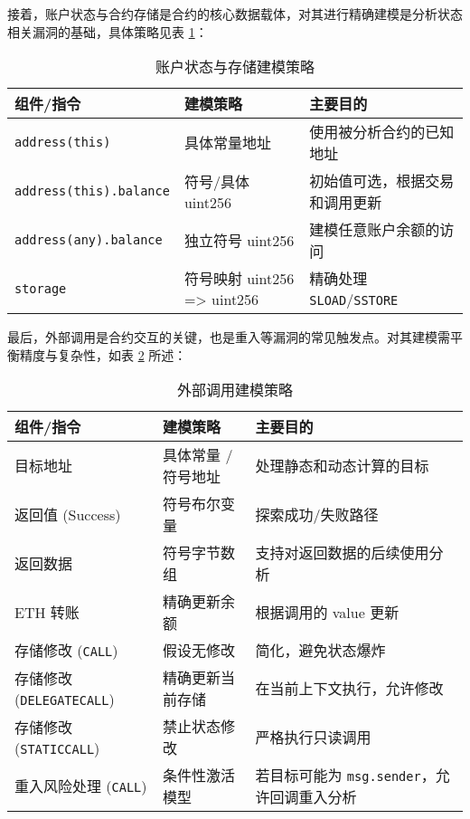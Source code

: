 \documentclass[print, master, vlined, timesmath]{DissertUESTC}
\begin{document}
接着，账户状态与合约存储是合约的核心数据载体，对其进行精确建模是分析状态相关漏洞的基础，具体策略见表 \ref{tab:account_state_modeling}：

\begin{table}[H] %
    \centering
    \caption{账户状态与存储建模策略}
    \begin{tabularx}{\linewidth}{lll}
        \toprule
        \textbf{组件/指令} & \textbf{建模策略} & \textbf{主要目的} \\
        \midrule
        \texttt{address(this)} & 具体常量地址 & 使用被分析合约的已知地址 \\
        \texttt{address(this).balance} & 符号/具体 uint256 & 初始值可选，根据交易和调用更新 \\
        \texttt{address(any).balance} & 独立符号 uint256 & 建模任意账户余额的访问 \\
        \texttt{storage} & 符号映射 uint256 => uint256 & 精确处理 \texttt{SLOAD}/\texttt{SSTORE} \\
        \bottomrule
    \end{tabularx}
    \label{tab:account_state_modeling}
\end{table}

最后，外部调用是合约交互的关键，也是重入等漏洞的常见触发点。对其建模需平衡精度与复杂性，如表 \ref{tab:external_call_modeling} 所述：

\begin{table}[H] %
    \centering
    \caption{外部调用建模策略}
    \small %
    \begin{tabularx}{\linewidth}{lll}
        \toprule
        \textbf{组件/指令} & \textbf{建模策略} & \textbf{主要目的} \\
        \midrule
        目标地址 & 具体常量 / 符号地址 & 处理静态和动态计算的目标 \\
        返回值 (Success) & 符号布尔变量 & 探索成功/失败路径\\
        返回数据 & 符号字节数组 & 支持对返回数据的后续使用分析 \\
        ETH 转账 & 精确更新余额 & 根据调用的 value 更新 \\
        存储修改 (\texttt{CALL}) & 假设无修改 & 简化，避免状态爆炸 \\
        存储修改 (\texttt{DELEGATECALL}) & 精确更新当前存储 & 在当前上下文执行，允许修改 \\
        存储修改 (\texttt{STATICCALL}) & 禁止状态修改 & 严格执行只读调用 \\
        重入风险处理 (\texttt{CALL}) & 条件性激活模型 & 若目标可能为 \texttt{msg.sender}，允许回调重入分析 \\
        \bottomrule
    \end{tabularx}
    \label{tab:external_call_modeling}
\end{table}
\end{document}
